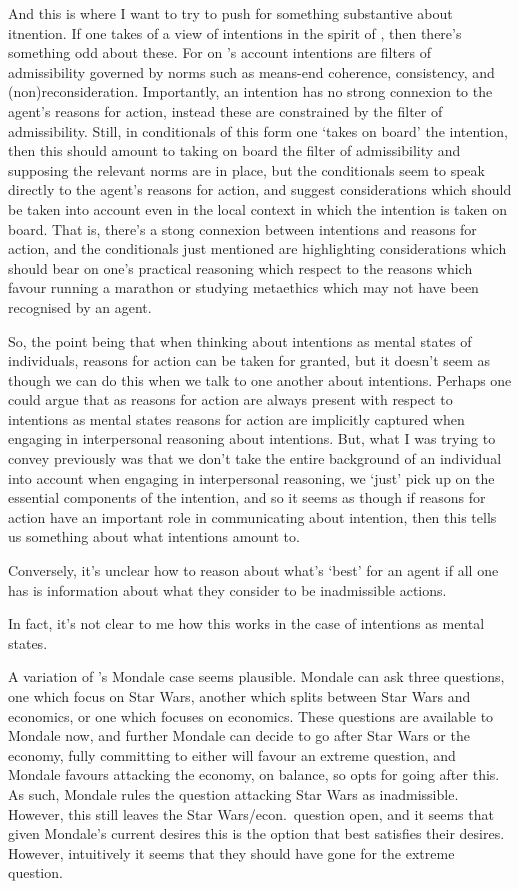 \documentclass[10pt]{article}
\begin{document}
And this is where I want to try to push for something substantive about itnention.
If one takes of a view of intentions in the spirit of \citeauthor{Bratman:1987aa}, then there's something odd about these.
For on \citeauthor{Bratman:1987aa}'s account intentions are filters of admissibility governed by norms such as means-end coherence, consistency, and (non)reconsideration.
Importantly, an intention has no strong connexion to the agent's reasons for action, instead these are constrained by the filter of admissibility.
Still, in conditionals of this form one `takes on board' the intention, then this should amount to taking on board the filter of admissibility and supposing the relevant norms are in place, but the conditionals seem to speak directly to the agent's reasons for action, and suggest considerations which should be taken into account even in the local context in which the intention is taken on board.
That is, there's a stong connexion between intentions and reasons for action, and the conditionals just mentioned are highlighting considerations which should bear on one's practical reasoning which respect to the reasons which favour running a marathon or studying metaethics which may not have been recognised by an agent.

So, the point being that when thinking about intentions as mental states of individuals, reasons for action can be taken for granted, but it doesn't seem as though we can do this when we talk to one another about intentions.
Perhaps one could argue that as reasons for action are always present with respect to intentions as mental states reasons for action are implicitly captured when engaging in interpersonal reasoning about intentions.
But, what I was trying to convey previously was that we don't take the entire background of an individual into account when engaging in interpersonal reasoning, we `just' pick up on the essential components of the intention, and so it seems as though if reasons for action have an important role in communicating about intention, then this tells us something about what intentions amount to.

Conversely, it's unclear how to reason about what's `best' for an agent if all one has is information about what they consider to be inadmissible actions.

In fact, it's not clear to me how this works in the case of intentions as mental states.

A variation of \citeauthor{Bratman:1987aa}'s Mondale case seems plausible.
Mondale can ask three questions, one which focus on Star Wars, another which splits between Star Wars and economics, or one which focuses on economics.
These questions are available to Mondale now, and further Mondale can decide to go after Star Wars or the economy, fully committing to either will favour an extreme question, and Mondale favours attacking the economy, on balance, so opts for going after this.
As such, Mondale rules the question attacking Star Wars as inadmissible.
However, this still leaves the Star Wars/econ.\ question open, and it seems that given Mondale's current desires this is the option that best satisfies their desires.
However, intuitively it seems that they should have gone for the extreme question.
\end{document}
